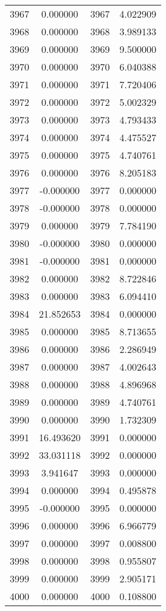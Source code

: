 \documentclass[12pt]{article}
\begin{document}
\begin{longtable}{@{}cccc@{}}
3967 & 0.000000 & 3967 & 4.022909 \\
3968 & 0.000000 & 3968 & 3.989133 \\
3969 & 0.000000 & 3969 & 9.500000 \\
3970 & 0.000000 & 3970 & 6.040388 \\
3971 & 0.000000 & 3971 & 7.720406 \\
3972 & 0.000000 & 3972 & 5.002329 \\
3973 & 0.000000 & 3973 & 4.793433 \\
3974 & 0.000000 & 3974 & 4.475527 \\
3975 & 0.000000 & 3975 & 4.740761 \\
3976 & 0.000000 & 3976 & 8.205183 \\
3977 & -0.000000 & 3977 & 0.000000 \\
3978 & -0.000000 & 3978 & 0.000000 \\
3979 & 0.000000 & 3979 & 7.784190 \\
3980 & -0.000000 & 3980 & 0.000000 \\
3981 & -0.000000 & 3981 & 0.000000 \\
3982 & 0.000000 & 3982 & 8.722846 \\
3983 & 0.000000 & 3983 & 6.094410 \\
3984 & 21.852653 & 3984 & 0.000000 \\
3985 & 0.000000 & 3985 & 8.713655 \\
3986 & 0.000000 & 3986 & 2.286949 \\
3987 & 0.000000 & 3987 & 4.002643 \\
3988 & 0.000000 & 3988 & 4.896968 \\
3989 & 0.000000 & 3989 & 4.740761 \\
3990 & 0.000000 & 3990 & 1.732309 \\
3991 & 16.493620 & 3991 & 0.000000 \\
3992 & 33.031118 & 3992 & 0.000000 \\
3993 & 3.941647 & 3993 & 0.000000 \\
3994 & 0.000000 & 3994 & 0.495878 \\
3995 & -0.000000 & 3995 & 0.000000 \\
3996 & 0.000000 & 3996 & 6.966779 \\
3997 & 0.000000 & 3997 & 0.008800 \\
3998 & 0.000000 & 3998 & 0.955807 \\
3999 & 0.000000 & 3999 & 2.905171 \\
4000 & 0.000000 & 4000 & 0.108800 \\

\end{longtable}
\end{document}
